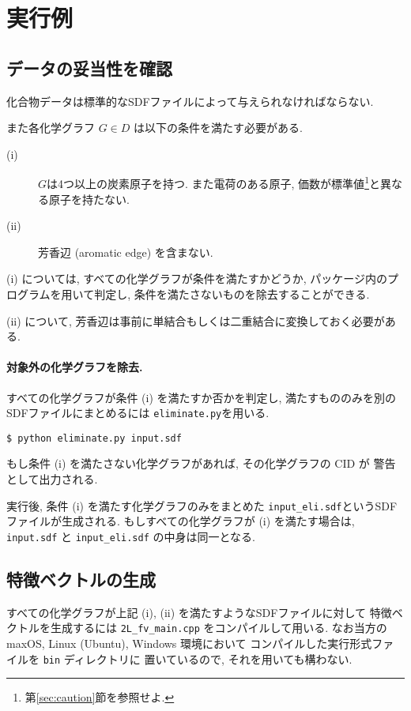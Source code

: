 \documentclass[11pt, titlepage, dvipdfmx, twoside]{jarticle}
\newcommand{\secref}[1]{第\ref{sec:#1}節}
\begin{document}
\clearpage
\section{実行例}
\label{sec:quick}

\subsection{データの妥当性を確認}
化合物データは標準的なSDFファイルによって与えられなければならない.

また各化学グラフ $G\in D$ は以下の条件を満たす必要がある.
\begin{description}
\item[(i)] $G$は4つ以上の炭素原子を持つ.
  また電荷のある原子, 価数が標準値\footnote{\secref{caution}を参照せよ.}と異なる原子を持たない.
\item[(ii)] 芳香辺 (aromatic edge) を含まない. 
\end{description}

(i) については, すべての化学グラフが条件を満たすかどうか,
パッケージ内のプログラムを用いて判定し,
条件を満たさないものを除去することができる. 

(ii) について, 芳香辺は事前に単結合もしくは二重結合に変換しておく必要がある. 


\paragraph{対象外の化学グラフを除去.}
すべての化学グラフが条件 (i) を満たすか否かを判定し,
満たすもののみを別のSDFファイルにまとめるには
{\tt eliminate.py}を用いる.

\begin{oframed}
{\small
\verb|$ python eliminate.py input.sdf|
}
\end{oframed}

もし条件 (i) を満たさない化学グラフがあれば, その化学グラフの CID が
警告として出力される.

実行後, 条件 (i) を満たす化学グラフのみをまとめた
{\tt input\_eli.sdf}というSDFファイルが生成される.
もしすべての化学グラフが (i) を満たす場合は,
{\tt input.sdf} と {\tt input\_eli.sdf} の中身は同一となる. 


\subsection{特徴ベクトルの生成}
すべての化学グラフが上記 (i), (ii) を満たすようなSDFファイルに対して
特徴ベクトルを生成するには {\tt 2L\_fv\_main.cpp} をコンパイルして用いる. 
なお当方の maxOS, Linux (Ubuntu), Windows 環境において
コンパイルした実行形式ファイルを {\tt bin} ディレクトリに
置いているので, それを用いても構わない. 
\end{document}
